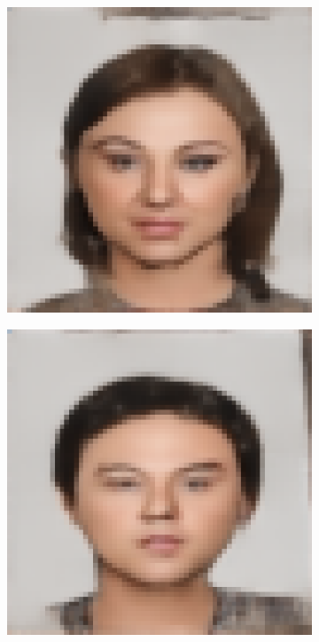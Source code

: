 \documentclass{IEEEcsmag}
\begin{document}
\begin{figure}[ht]
\begin{subfigure}{0.12\textwidth}
    \end{subfigure}
    \begin{subfigure}{0.12\textwidth}
        \includegraphics[width=\linewidth]{CUHK_Student/generated_images/f1-008-01-sz1.jpg_CVAE.png}
    \end{subfigure}
    \begin{subfigure}{0.12\textwidth}
        \includegraphics[width=\linewidth]{CUHK_Student/generated_images/M2-018-01-sz1.jpg_CVAE.png}
    \end{subfigure}


\end{figure}
\end{document}
